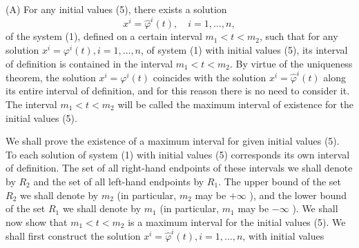 \documentclass[10pt,a5paper]{book}
\theoremstyle{plain}
\theoremstyle{definition}
\theoremstyle{remark}
\begin{document}
(A) For any initial values (5), there exists a solution
\[
x^{i}=\hat{\varphi}^{i}(t), \quad i=1, \ldots, n,
\]
of the system (1), defined on a certain interval $m_{1}<t<m_{2}$, such that for any solution $x^{i}=\varphi^{i}(t), i=1, \ldots, n$, of system (1) with initial values (5), its interval of definition is contained in the interval $m_{1}<t<m_{2}$. By virtue of the uniqueness theorem, the solution $x^{i}=\varphi^{i}(t)$ coincides with the solution $x^{i}=\hat{\varphi}^{i}(t)$ along its entire interval of definition, and for this reason there is no need to consider it. The interval $m_{1}<t<m_{2}$ will be called the maximum interval of existence for the initial values (5).

We shall prove the existence of a maximum interval for given initial values (5). To each solution of system (1) with initial values (5) corresponds its own interval of definition. The set of all right-hand endpoints of these intervals we shall denote by $R_{2}$ and the set of all left-hand endpoints by $R_{1}$. The upper bound of the set $R_{2}$ we shall denote by $m_{2}$ (in particular, $m_{2}$ may be $+\infty$ ), and the lower bound of the set $R_{1}$ we shall denote by $m_{1}$ (in particular, $m_{1}$ may be $-\infty$ ). We shall now show that $m_{1}<t<m_{2}$ is a maximum interval for the initial values (5). We shall first construct the solution $x^{i}=\hat{\varphi}^{i}(t), i=1, \ldots, n$, with initial values
\end{document}
